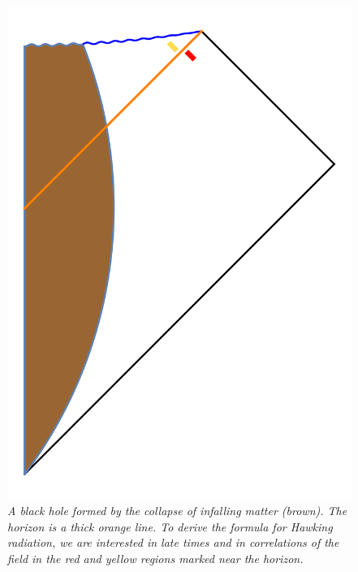 \documentclass[12pt]{article}
\begin{document}
\begin{figure}[!ht]
\begin{center}
\includegraphics[height=0.4\textheight]{naivepenrose.png}
\caption{\em A black hole formed by the collapse of infalling matter (brown). The horizon is a thick orange line. To derive the formula for Hawking radiation, we are interested in late times and in correlations of the field in the red and yellow regions marked near the horizon. \label{naivepenrose}}
\end{center}
\end{figure}
\end{document}
